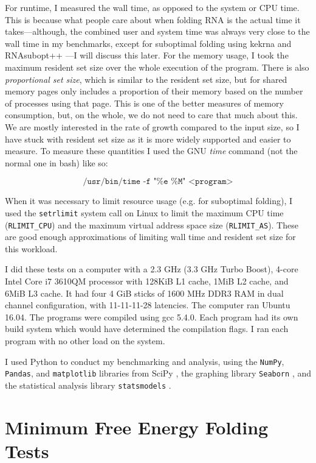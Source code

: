 \documentclass{cshonours}
\begin{document}
For runtime, I measured the wall time, as opposed to the system or CPU time. This is because what people care about when folding RNA is the actual time it takes---although, the combined user and system time was always very close to the wall time in my benchmarks, except for suboptimal folding using kekrna and RNAsubopt++ ---I will discuss this later. For the memory usage, I took the maximum resident set size over the whole execution of the program. There is also \emph{proportional set size}, which is similar to the resident set size, but for shared memory pages only includes a proportion of their memory based on the number of processes using that page. This is one of the better measures of memory consumption, but, on the whole, we do not need to care that much about this. We are mostly interested in the rate of growth compared to the input size, so I have stuck with resident set size as it is more widely supported and easier to measure. To measure these quantities I used the GNU \emph{time} command (not the normal one in bash) like so:

$$\texttt{/usr/bin/time -f "\%e \%M" <program>}$$

When it was necessary to limit resource usage (e.g. for suboptimal folding), I used the \texttt{setrlimit} system call on Linux to limit the maximum CPU time (\texttt{RLIMIT\_CPU}) and the maximum virtual address space size (\texttt{RLIMIT\_AS}). These are good enough approximations of limiting wall time and resident set size for this workload.

I did these tests on a computer with a 2.3 GHz (3.3 GHz Turbo Boost), 4-core Intel Core i7 3610QM processor with 128KiB L1 cache, 1MiB L2 cache, and 6MiB L3 cache. It had four 4 GiB sticks of 1600 MHz DDR3 RAM in dual channel configuration, with 11-11-11-28 latencies. The computer ran Ubuntu 16.04. The programs were compiled using gcc 5.4.0. Each program had its own build system which would have determined the compilation flags. I ran each program with no other load on the system.

I used Python to conduct my benchmarking and analysis, using the \texttt{NumPy}, \texttt{Pandas}, and \texttt{matplotlib} libraries from SciPy \cite{scipy}, the graphing library \texttt{Seaborn} \cite{seaborn}, and the statistical analysis library \texttt{statsmodels} \cite{statsmodels}.

\section{Minimum Free Energy Folding Tests}
\end{document}
